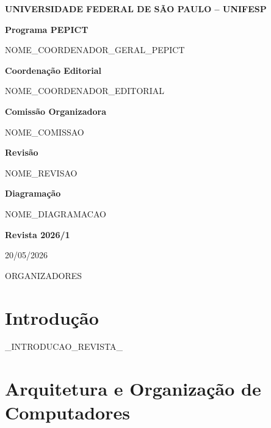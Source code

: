 \documentclass[12pt,openright,oneside,a4paper]{report}
\begin{document}
\begin{flushleft}

{\large \textbf{UNIVERSIDADE FEDERAL DE SÃO PAULO – UNIFESP}}

\vspace{1cm}

\textbf{Programa PEPICT}

NOME_COORDENADOR_GERAL_PEPICT

\vspace{0.7cm}

\textbf{Coordenação Editorial}

NOME_COORDENADOR_EDITORIAL

\vspace{0.7cm}

\textbf{Comissão Organizadora}

NOME_COMISSAO

\vspace{0.7cm}

\textbf{Revisão}

NOME_REVISAO

\vspace{0.7cm}

\textbf{Diagramação}

NOME_DIAGRAMACAO

\vspace{1.5cm}

\textbf{\large Revista 2026/1}

20/05/2026

\vspace{0.5cm}

ORGANIZADORES

\vspace{1cm}

\end{flushleft}

\clearpage


\tableofcontents
\clearpage


\chapter{Introdução}

_INTRODUCAO_REVISTA_


\chapter{Arquitetura e Organização de Computadores}
\end{document}
